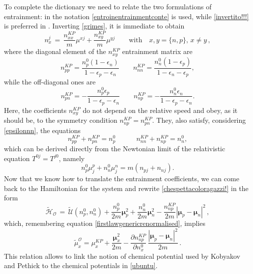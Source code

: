 \documentclass[usenatbib]{mnras}
\newcommand{\spc}{\quad \quad \quad}
\begin{document}
To complete the dictionary we need to relate the two formulations of entrainment: in \cite{prix2004} the notation \eqref{entroinentrainmentconte} is used, while  \eqref{invertito!!!} is preferred in \cite{KP2017}. Inverting \eqref{grimes}, it is immediate to obtain
%
\begin{equation}
n_x^j 
\, = \, 
\dfrac{n_{xx}^{KP}}{m} \mu^{xj} + \dfrac{n_{x y}^{KP}}{m} \mu^{yj} 
\qquad
\text{with}
\quad
 x,y =\{n,p\} 
\text{, } 
x \neq y
\, ,
\end{equation}
%
where the diagonal element of the $n_{x y}^{KP}$ entrainment matrix are
%
\begin{equation}
n_{pp}^{KP} = \dfrac{n_p^0 (1-\epsilon_n)}{1-\epsilon_p-\epsilon_n } \qquad n_{nn}^{KP} = \dfrac{n_n^0 (1-\epsilon_p)}{1-\epsilon_n-\epsilon_p } , 
\end{equation}
%
while the off-diagonal ones are
%
\begin{equation}
 n_{pn}^{KP} = -\dfrac{n_p^0 \epsilon_p}{1-\epsilon_p-\epsilon_n } \qquad 
 n_{np}^{KP} = -\dfrac{n_n^0 \epsilon_n}{1-\epsilon_p-\epsilon_n }.
\end{equation}
%
Here, the coefficients $n_{xy}^{KP}$ do not depend on the relative speed and obey, as it should be, to the symmetry condition $n_{np}^{KP}= n_{pn}^{KP}$. They, also satisfy, considering \eqref{epsilonnn}, the equations
%
\begin{equation*}
n_{pp}^{KP}+ n_{pn}^{KP} = n_p^0 \spc  n_{nn}^{KP}+ n_{np}^{KP} = n_n^0,
\end{equation*}
%
which can be derived directly from the Newtonian limit of the relativistic equation $T^{0j}=T^{j0}$, namely
%
\begin{equation}
n_p^0 \mu^p_j + n_n^0 \mu^n_j = m (n_{pj}+ n_{nj}).
\end{equation}
%
Now that we know how to translate the entrainment coefficients, we can come back to the Hamiltonian for the system and rewrite \eqref{chespettacoloragazzi!} in the form
%
\begin{equation}
\label{accazero44}
\tilde{\mathcal{H}}_\mathcal{O}
\, = \,  
\tilde{\mathcal{U}}(n_p^0,n_n^0) + \dfrac{n_p^0}{2m} \boldsymbol{\mu}_p^2 
+ \dfrac{n_n^0}{2m} \boldsymbol{\mu}_n^2 - \dfrac{n_{np}^{KP}}{2m} 
|\boldsymbol{\mu}_p - \boldsymbol{\mu}_n|^2 \, ,
\end{equation}
%
which, remembering equation \eqref{firstlawgenericrenormalised}, implies
\begin{equation}\label{xsdfgrt}
\tilde{\mu}_x^\mathcal{O} 
= 
\mu_x^{KP} + \dfrac{\boldsymbol{\mu}_x^2}{2m} - 
 \dfrac{\partial n_{np}^{KP}}{\partial n_x^0} 
\, \dfrac{|\boldsymbol{\mu}_p - \boldsymbol{\mu}_n|^2}{2m} \, .
\end{equation}
%
This relation allows to link the notion of chemical potential used by Kobyakov and Pethick to the chemical potentials in \eqref{ubuntu}.
\end{document}
